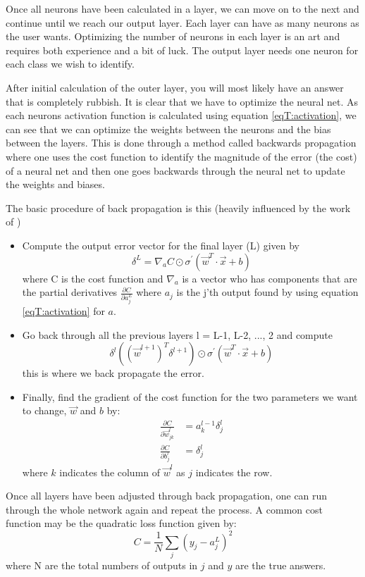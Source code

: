 Once all neurons have been calculated in a layer, we can move on to the next and continue until we reach our output layer. Each layer can have as many neurons as the user wants. Optimizing the number of neurons in each layer is an art and requires both experience and a bit of luck. The output layer needs one neuron for each class we wish to identify.

After initial calculation of the outer layer, you will most likely have an answer that is completely rubbish. It is clear that we have to optimize the neural net. As each neurons activation function is calculated using equation \eqref{eqT:activation}, we can see that we can optimize the weights between the neurons and the bias between the layers. This is done through a method called backwards propagation where one uses the cost function to identify the magnitude of the error (the cost) of a neural net and then one goes backwards through the neural net to update the weights and biases.

The basic procedure of back propagation is this (heavily influenced by the work of \citet{Nielsen})
\begin{itemize}
\item Compute the output error vector for the final layer (L) given by
\begin{equation*}
\delta^L = \nabla_a C \odot \sigma^{'}(\vec{w}^T \cdot \vec{x} + b)
\end{equation*}
where C is the cost function and $\nabla_a$ is a vector who has components that are the partial derivatives $\frac{\partial C}{\partial a_j^L}$ where $a_j$ is the j'th output found by using equation \eqref{eqT:activation} for $a$.
\item Go back through all the previous layers l = L-1, L-2, ..., 2 and compute
\begin{equation*}
\delta^l ((\vec{w}^{l + 1})^T \delta^{l + 1}) \odot \sigma^{'}(\vec{w}^T \cdot \vec{x} + b)
\end{equation*}
this is where we back propagate the error.
\item Finally, find the gradient of the cost function for the two parameters we want to change, $\vec{w}$ and $b$ by:
\begin{align*}
\frac{\partial C}{\partial \vec{w}_{jk}^l} &= a_k^{l-1}\delta_{j}^{l} \\
\frac{\partial C}{\partial b_{j}^l} &= \delta_{j}^{l}
\end{align*}
where $k$ indicates the column of $\vec{w}^l$ as $j$ indicates the row.
\end{itemize}
Once all layers have been adjusted through back propagation, one can run through the whole network again and repeat the process. A common cost function may be the quadratic loss function given by:
\begin{equation}
C = \frac{1}{N} \sum\limits_{j} (y_j - a_j^L)^2
\end{equation}
where N are the total numbers of outputs in $j$ and $y$ are the true answers.

